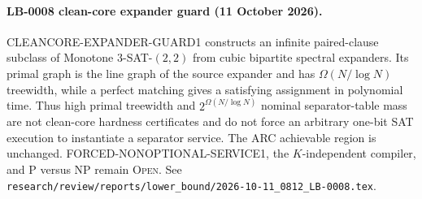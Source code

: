 \paragraph{LB-0008 clean-core expander guard (11 October 2026).}
CLEANCORE-EXPANDER-GUARD1 constructs an infinite paired-clause subclass of
Monotone $3$-SAT-$(2,2)$ from cubic bipartite spectral expanders.  Its primal
graph is the line graph of the source expander and has
$\Omega(N/\log N)$ treewidth, while a perfect matching gives a satisfying
assignment in polynomial time.  Thus high primal treewidth and
$2^{\Omega(N/\log N)}$ nominal separator-table mass are not clean-core
hardness certificates and do not force an arbitrary one-bit SAT execution to
instantiate a separator service.  The ARC achievable region is unchanged.
FORCED-NONOPTIONAL-SERVICE1, the $K$-independent compiler, and P versus NP
remain \textsc{Open}.  See
\texttt{research/review/reports/lower\_bound/2026-10-11\_0812\_LB-0008.tex}.
